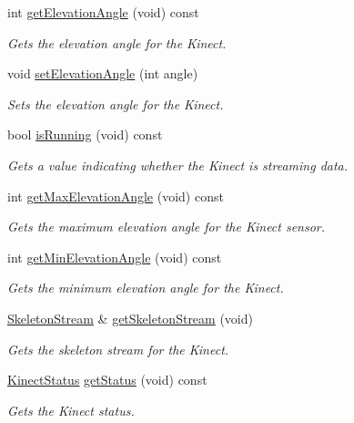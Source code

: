 \begin{DoxyCompactItemize}
int \hyperlink{class_kinect_sensor_a397ae961ca6f02f211c2ad08ce1045e2}{get\-Elevation\-Angle} (void) const 
\begin{DoxyCompactList}\small\item\em \-Gets the elevation angle for the \-Kinect. \end{DoxyCompactList}\item 
void \hyperlink{class_kinect_sensor_a491aec14d66a2fb06f72cdc9e3fecc63}{set\-Elevation\-Angle} (int angle)
\begin{DoxyCompactList}\small\item\em \-Sets the elevation angle for the \-Kinect. \end{DoxyCompactList}\item 
bool \hyperlink{class_kinect_sensor_a7da0cd93b373b24ec3d446814e0fe8ff}{is\-Running} (void) const 
\begin{DoxyCompactList}\small\item\em \-Gets a value indicating whether the \-Kinect is streaming data. \end{DoxyCompactList}\item 
int \hyperlink{class_kinect_sensor_aa963027140b69ccce62e4cbdaa33abc1}{get\-Max\-Elevation\-Angle} (void) const 
\begin{DoxyCompactList}\small\item\em \-Gets the maximum elevation angle for the \-Kinect sensor. \end{DoxyCompactList}\item 
int \hyperlink{class_kinect_sensor_ad82adee81554121259dcf9b0bab28145}{get\-Min\-Elevation\-Angle} (void) const 
\begin{DoxyCompactList}\small\item\em \-Gets the minimum elevation angle for the \-Kinect. \end{DoxyCompactList}\item 
\hyperlink{class_skeleton_stream}{\-Skeleton\-Stream} \& \hyperlink{class_kinect_sensor_a23daf40720d072a3f49419515e9f5186}{get\-Skeleton\-Stream} (void)
\begin{DoxyCompactList}\small\item\em \-Gets the skeleton stream for the \-Kinect. \end{DoxyCompactList}\item 
\hyperlink{kinect_status_8h_a485fe7473bcf235f8c51dda0754afd9f}{\-Kinect\-Status} \hyperlink{class_kinect_sensor_ad7d67f65e253b9d57735efe1d6190bc7}{get\-Status} (void) const 
\begin{DoxyCompactList}\small\item\em \-Gets the \-Kinect status. \end{DoxyCompactList}\item 

\end{DoxyCompactItemize}
